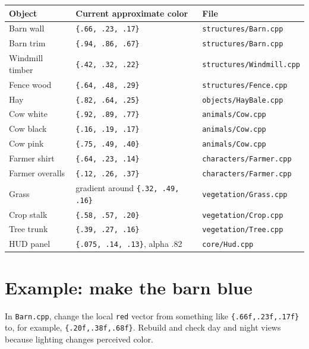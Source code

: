 \documentclass[11pt,a4paper,openany]{book}
\newcommand{\code}[1]{\texttt{#1}}
\newcommand{\file}[1]{\nolinkurl{#1}}
\newcommand{\rgb}[3]{\code{\{#1, #2, #3\}}}
\begin{document}
\begin{longtable}{@{}p{}p{}p{}@{}}
	\toprule
	Object          & Current approximate color           & File                           \\
	\midrule
	\endhead
	Barn wall       & \rgb{.66}{.23}{.17}                 & \file{structures/Barn.cpp}     \\
	Barn trim       & \rgb{.94}{.86}{.67}                 & \file{structures/Barn.cpp}     \\
	Windmill timber & \rgb{.42}{.32}{.22}                 & \file{structures/Windmill.cpp} \\
	Fence wood      & \rgb{.64}{.48}{.29}                 & \file{structures/Fence.cpp}    \\
	Hay             & \rgb{.82}{.64}{.25}                 & \file{objects/HayBale.cpp}     \\
	Cow white       & \rgb{.92}{.89}{.77}                 & \file{animals/Cow.cpp}         \\
	Cow black       & \rgb{.16}{.19}{.17}                 & \file{animals/Cow.cpp}         \\
	Cow pink        & \rgb{.75}{.49}{.40}                 & \file{animals/Cow.cpp}         \\
	Farmer shirt    & \rgb{.64}{.23}{.14}                 & \file{characters/Farmer.cpp}   \\
	Farmer overalls & \rgb{.12}{.26}{.37}                 & \file{characters/Farmer.cpp}   \\
	Grass           & gradient around \rgb{.32}{.49}{.16} & \file{vegetation/Grass.cpp}    \\
	Crop stalk      & \rgb{.58}{.57}{.20}                 & \file{vegetation/Crop.cpp}     \\
	Tree trunk      & \rgb{.39}{.27}{.16}                 & \file{vegetation/Tree.cpp}     \\
	HUD panel       & \rgb{.075}{.14}{.13}, alpha .82     & \file{core/Hud.cpp}            \\
	\bottomrule
\end{longtable}

\section{Example: make the barn blue}
In \file{Barn.cpp}, change the local \code{red} vector from something like \code{\{.66f,.23f,.17f\}} to, for example, \code{\{.20f,.38f,.68f\}}. Rebuild and check day and night views because lighting changes perceived color.
\end{document}
